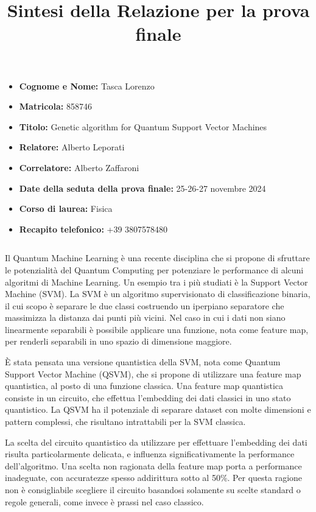\documentclass{article}
\title{Sintesi della Relazione per la prova finale}
\date{}
\author{}
\begin{document}


\begin{itemize}
   \item \textbf{Cognome e Nome:} Tasca Lorenzo
    \item \textbf{Matricola:} 858746
    \item \textbf{Titolo:} Genetic algorithm for Quantum Support Vector Machines    \item \textbf{Relatore:} Alberto Leporati
    \item \textbf{Correlatore:} Alberto Zaffaroni
    \item \textbf{Date della seduta della prova finale:} 25-26-27 novembre 2024 
  \item \textbf{Corso di laurea:} Fisica
    \item \textbf{Recapito telefonico:} +39 3807578480
    
\end{itemize}

$\,$

Il Quantum Machine Learning è una recente disciplina che si propone di sfruttare le potenzialità del Quantum Computing per potenziare le performance di alcuni algoritmi di Machine Learning. Un esempio tra i più studiati è la Support Vector Machine (SVM). La SVM è un algoritmo supervisionato di classificazione binaria, il cui scopo è separare le due classi costruendo un iperpiano separatore che massimizza la distanza dai punti più vicini. Nel caso in cui i dati non siano linearmente separabili è possibile applicare una funzione, nota come feature map, per renderli separabili in uno spazio di dimensione maggiore. 

È stata pensata una versione quantistica della SVM, nota come Quantum Support Vector Machine (QSVM), che si propone di utilizzare una feature map quantistica, al posto di una funzione classica. Una feature map quantistica consiste in un circuito, che effettua l'embedding dei dati classici in uno stato quantistico. La QSVM ha il potenziale di separare dataset con molte dimensioni e pattern complessi, che risultano intrattabili per la SVM classica. 

La scelta del circuito quantistico da utilizzare per effettuare l'embedding dei dati risulta particolarmente delicata, e influenza significativamente la performance dell'algoritmo. Una scelta non ragionata della feature map porta a performance inadeguate, con accuratezze spesso addirittura sotto al 50\%. Per questa ragione non è consigliabile scegliere il circuito basandosi solamente su scelte standard o regole generali, come invece è prassi nel caso classico.
\end{document}
